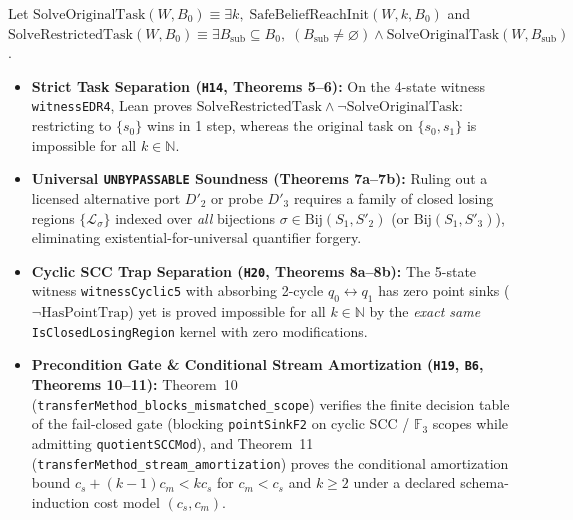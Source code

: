 \documentclass[10pt,a4paper]{article}
\newcommand{\code}[1]{\nolinkurl{#1}}
\begin{document}
Let $\mathrm{SolveOriginalTask}(W, B_0) \equiv \exists k,\; \mathrm{SafeBeliefReachInit}(W, k, B_0)$ and $\mathrm{SolveRestrictedTask}(W, B_0) \equiv \exists B_{\mathrm{sub}} \subseteq B_0,\; (B_{\mathrm{sub}} \ne \varnothing) \land \mathrm{SolveOriginalTask}(W, B_{\mathrm{sub}})$.
\begin{itemize}
\item \textbf{Strict Task Separation (\code{H14}, Theorems 5--6):} On the 4-state witness \code{witnessEDR4}, Lean proves $\mathrm{SolveRestrictedTask} \land \neg\mathrm{SolveOriginalTask}$: restricting to $\{s_0\}$ wins in 1 step, whereas the original task on $\{s_0, s_1\}$ is impossible for all $k \in \mathbb{N}$.
\item \textbf{Universal \code{UNBYPASSABLE} Soundness (Theorems 7a--7b):} Ruling out a licensed alternative port $D'_2$ or probe $D'_3$ requires a family of closed losing regions $\{\mathcal{L}_\sigma\}$ indexed over \emph{all} bijections $\sigma \in \mathrm{Bij}(S_1, S'_2)$ (or $\mathrm{Bij}(S_1, S'_3)$), eliminating existential-for-universal quantifier forgery.
\item \textbf{Cyclic SCC Trap Separation (\code{H20}, Theorems 8a--8b):} The 5-state witness \code{witnessCyclic5} with absorbing 2-cycle $q_0 \leftrightarrow q_1$ has zero point sinks ($\neg\mathrm{HasPointTrap}$) yet is proved impossible for all $k \in \mathbb{N}$ by the \emph{exact same} \code{IsClosedLosingRegion} kernel with zero modifications.
\item \textbf{Precondition Gate \& Conditional Stream Amortization (\code{H19}, \code{B6}, Theorems 10--11):} Theorem~10 (\code{transferMethod_blocks_mismatched_scope}) verifies the finite decision table of the fail-closed gate (blocking \code{pointSinkF2} on cyclic SCC / $\mathbb{F}_3$ scopes while admitting \code{quotientSCCMod}), and Theorem~11 (\code{transferMethod_stream_amortization}) proves the conditional amortization bound $c_s + (k-1)c_m < k c_s$ for $c_m < c_s$ and $k \ge 2$ under a declared schema-induction cost model $(c_s, c_m)$.
\end{itemize}
\end{document}
